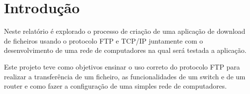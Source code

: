 \section{Introdução}

Neste relatório é explorado o processo de criação de uma aplicação de download de ficheiros usando o protocolo FTP e TCP/IP juntamente com o desenvolvimento de uma rede de computadores na qual será testada a aplicação. 

Este projeto teve como objetivos ensinar o uso correto do protocolo FTP para realizar a transferência de um ficheiro, as funcionalidades de um switch e de um router e como fazer a configuração de uma simples rede de computadores.
